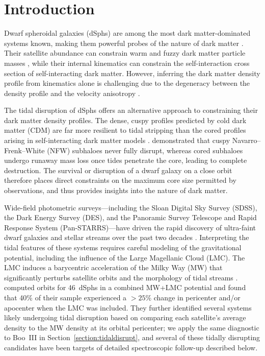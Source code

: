 \documentclass[twocolumn, apj, numberedappendix, appendixfloats]{openjournal_dhayaa}
\begin{document}

\section{Introduction} \label{section:intro}

Dwarf spheroidal galaxies (dSphs) are among the most dark matter-dominated systems known, making them powerful probes of the nature of dark matter \citep[see, e.g.,][]{Bullock2017ARAA}.
Their satellite abundance can constrain warm and fuzzy dark matter particle masses \citep{Nadler2021}, while their internal kinematics can constrain the self-interaction cross section of self-interacting dark matter.
However, inferring the dark matter density profile from kinematics alone is challenging due to the degeneracy between the density profile and the velocity anisotropy \citep{Lokas2002, Guerra2023}.

The tidal disruption of dSphs offers an alternative approach to constraining their dark matter density profiles.
The dense, cuspy profiles predicted by cold dark matter (CDM) are far more resilient to tidal stripping than the cored profiles arising in self-interacting dark matter models \citep{Penarrubia2010}. \citet{Errani2023} demonstrated that cuspy Navarro--Frenk--White (NFW) subhaloes never fully disrupt, whereas cored subhaloes undergo runaway mass loss once tides penetrate the core, leading to complete destruction. The survival or disruption of a dwarf galaxy on a close orbit therefore places direct constraints on the maximum core size permitted by observations, and thus provides insights into the nature of dark matter.

Wide-field photometric surveys---including the Sloan Digital Sky Survey (SDSS), the Dark Energy Survey (DES), and the Panoramic Survey Telescope and Rapid Response System (Pan-STARRS)---have driven the rapid discovery of ultra-faint dwarf galaxies and stellar streams over the past two decades \citep[see][and references therein]{Simon2019, Koposov2015, Martin2015, Luque2017, Koposov2018, Torrealba2018, Homma2019, DrlicaWagner2020, Mau2020, Cerny2022, Cerny2023}. Interpreting the tidal features of these systems requires careful modeling of the gravitational potential, including the influence of the Large Magellanic Cloud (LMC). The LMC induces a barycentric acceleration of the Milky Way (MW) that significantly perturbs satellite orbits and the morphology of tidal streams \citep{Erkal2019, Erkal2020, Nadler2020}. \citet{Pace2022} computed orbits for 46~dSphs in a combined MW+LMC potential and found that 40\% of their sample experienced a $>25\%$ change in pericenter and/or apocenter when the LMC was included. They further identified several systems likely undergoing tidal disruption based on comparing each satellite's average density to the MW density at its orbital pericenter; we apply the same diagnostic to Boo~III in Section~\ref{section:tidaldisrupt}, and several of these tidally disrupting candidates have been targets of detailed spectroscopic follow-up described below.
\end{document}
